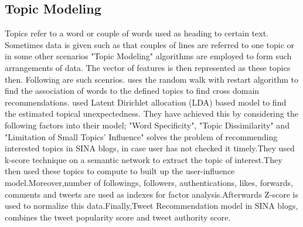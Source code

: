 \subsection{Topic Modeling}
Topics refer to a word or couple of words used as heading to certain text. Sometimes data is given such as that couples of lines are referred to one topic or in some other scenarios "Topic Modeling" algorithms are employed to form such arrangements of data. The vector of features is then represented as these topics then. Following are such scenrios.\newline
\cite{N65} uses the random walk with restart algorithm to find the association of words to the defined topics to find cross domain recommendations.
\cite{N70} used Latent Dirichlet allocation (LDA) based model to find the estimated topical unexpectedness. They have achieved this by considering the following factors into their model; "Word Specificity", "Topic Dissimilarity" and "Limitation of Small Topics’ Influence"
\cite{N26}solves the problem of recommending interested topics in SINA blogs, in case user has not checked it timely.They used k-score technique on a semantic network to extract the topic of interest.They then used these topics to compute to built up the user-influence model.Moreover,number of followings, followers, authentications, likes, forwards, comments and tweets are used as indexes for factor analysis.Afterwards Z-score is used to normalize this data.Finally,Tweet Recommendation model in SINA blogs, combines the tweet popularity score and tweet authority score.

